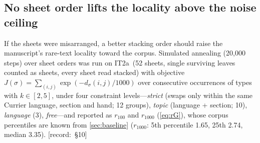 \documentclass[11pt,a4paper]{article}
\newcommand{\src}[1]{{\footnotesize\color{muted}\sffamily\mbox{[record: \S#1]}}}
\newcommand{\IT}{\textcolor{it2a}{IT2a}}
\begin{document}
\subsection{No sheet order lifts the locality above the noise ceiling}
\label{sec:optimize}

If the sheets were misarranged, a better stacking order should raise the manuscript's rare-text locality toward the corpus. Simulated annealing (20,000 steps) over sheet orders was run on \IT\ (52 sheets, single surviving leaves counted as sheets, every sheet read stacked) with objective $J(\sigma)=\sum_{(i,j)}\exp(-d_\sigma(i,j)/1000)$ over consecutive occurrences of types with $k\in[2,5]$, under four constraint levels---\emph{strict} (swaps only within the same Currier language, section and hand; 12 groups), \emph{topic} (language + section; 10), \emph{language} (3), \emph{free}---and reported as $r_{100}$ and $r_{1000}$ (\cref{eq:rG}), whose corpus percentiles are known from \cref{sec:baseline} ($r_{1000}$: 5th percentile 1.65, 25th 2.74, median 3.35). \src{10}
\end{document}
